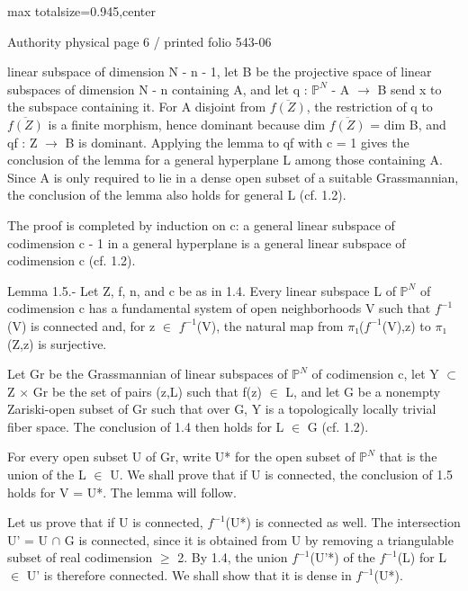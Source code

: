 \documentclass[10pt,a4paper]{article}
\begin{document}
\noindent\begin{adjustbox}{max totalsize={\textwidth}{0.945\textheight},center}
\begin{minipage}{\textwidth}
\noindent\hfill\scriptsize Authority physical page 6 / printed folio 543-06\par\normalsize
\noindent linear subspace of dimension N - n - 1, let B be the projective space of linear subspaces of dimension N - n containing A, and let q : \ensuremath{ℙ^N} - A \ensuremath{→} B send x to the subspace containing it. For A disjoint from \ensuremath{\overline{f(Z)}}, the restriction of q to \ensuremath{\overline{f(Z)}} is a finite morphism, hence dominant because dim \ensuremath{\overline{f(Z)}} = dim B, and qf : Z \ensuremath{→} B is dominant. Applying the lemma to qf with c = 1 gives the conclusion of the lemma for a general hyperplane L among those containing A. Since A is only required to lie in a dense open subset of a suitable Grassmannian, the conclusion of the lemma also holds for general L (cf. 1.2).\par\smallskip
\noindent The proof is completed by induction on c: a general linear subspace of codimension c - 1 in a general hyperplane is a general linear subspace of codimension c (cf. 1.2).\par\smallskip
\noindent Lemma 1.5.- Let Z, f, n, and c be as in 1.4. Every linear subspace L of \ensuremath{ℙ^N} of codimension c has a fundamental system of open neighborhoods V such that \ensuremath{f^{-1}}(V) is connected and, for z \ensuremath{∈} \ensuremath{f^{-1}}(V), the natural map from \ensuremath{π₁}(\ensuremath{f^{-1}}(V),z) to \ensuremath{π₁}(Z,z) is surjective.\par\smallskip
\noindent Let Gr be the Grassmannian of linear subspaces of \ensuremath{ℙ^N} of codimension c, let Y \ensuremath{⊂} Z \ensuremath{×} Gr be the set of pairs (z,L) such that f(z) \ensuremath{∈} L, and let G be a nonempty Zariski-open subset of Gr such that over G, Y is a topologically locally trivial fiber space. The conclusion of 1.4 then holds for L \ensuremath{∈} G (cf. 1.2).\par\smallskip
\noindent For every open subset U of Gr, write U* for the open subset of \ensuremath{ℙ^N} that is the union of the L \ensuremath{∈} U. We shall prove that if U is connected, the conclusion of 1.5 holds for V = U*. The lemma will follow.\par\smallskip
\noindent Let us prove that if U is connected, \ensuremath{f^{-1}}(U*) is connected as well. The intersection U' = U \ensuremath{∩} G is connected, since it is obtained from U by removing a triangulable subset of real codimension \ensuremath{≥} 2. By 1.4, the union \ensuremath{f^{-1}}(U'*) of the \ensuremath{f^{-1}}(L) for L \ensuremath{∈} U' is therefore connected. We shall show that it is dense in \ensuremath{f^{-1}}(U*).\par\smallskip

\end{minipage}
\end{adjustbox}
\end{document}
